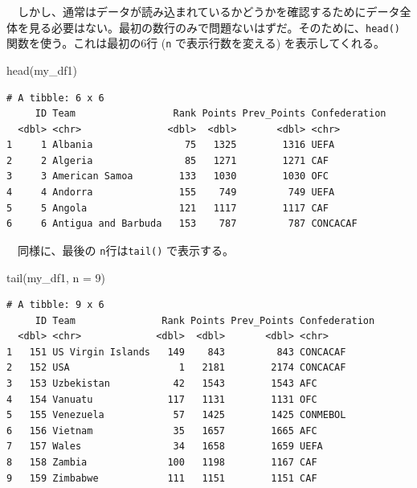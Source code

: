 \documentclass[
  a4paper,
  pandoc,
  ja=standard,
  jafont=haranoaji]{bxjsbook}
\newenvironment{Shaded}{\begin{snugshade}}{\end{snugshade}}
\newcommand{\AttributeTok}[1]{\textcolor[rgb]{0.00,0.48,0.65}{#1}}
\newcommand{\DecValTok}[1]{\textcolor[rgb]{0.68,0.00,0.00}{#1}}
\newcommand{\FunctionTok}[1]{\textcolor[rgb]{0.28,0.35,0.67}{#1}}
\newcommand{\NormalTok}[1]{\textcolor[rgb]{0.00,0.48,0.65}{#1}}
\begin{document}
　しかし、通常はデータが読み込まれているかどうかを確認するためにデータ全体を見る必要はない。最初の数行のみで問題ないはずだ。そのために、\texttt{head()}
関数を使う。これは最初の6行 (\texttt{n} で表示行数を変える)
を表示してくれる。

\begin{Shaded}
\begin{Highlighting}[numbers=left,,]
\FunctionTok{head}\NormalTok{(my\_df1)}
\end{Highlighting}
\end{Shaded}

\begin{verbatim}
# A tibble: 6 x 6
     ID Team                 Rank Points Prev_Points Confederation
  <dbl> <chr>               <dbl>  <dbl>       <dbl> <chr>        
1     1 Albania                75   1325        1316 UEFA         
2     2 Algeria                85   1271        1271 CAF          
3     3 American Samoa        133   1030        1030 OFC          
4     4 Andorra               155    749         749 UEFA         
5     5 Angola                121   1117        1117 CAF          
6     6 Antigua and Barbuda   153    787         787 CONCACAF     
\end{verbatim}

　同様に、最後の \texttt{n}行は\texttt{tail()} で表示する。

\begin{Shaded}
\begin{Highlighting}[numbers=left,,]
\FunctionTok{tail}\NormalTok{(my\_df1, }\AttributeTok{n =} \DecValTok{9}\NormalTok{)}
\end{Highlighting}
\end{Shaded}

\begin{verbatim}
# A tibble: 9 x 6
     ID Team               Rank Points Prev_Points Confederation
  <dbl> <chr>             <dbl>  <dbl>       <dbl> <chr>        
1   151 US Virgin Islands   149    843         843 CONCACAF     
2   152 USA                   1   2181        2174 CONCACAF     
3   153 Uzbekistan           42   1543        1543 AFC          
4   154 Vanuatu             117   1131        1131 OFC          
5   155 Venezuela            57   1425        1425 CONMEBOL     
6   156 Vietnam              35   1657        1665 AFC          
7   157 Wales                34   1658        1659 UEFA         
8   158 Zambia              100   1198        1167 CAF          
9   159 Zimbabwe            111   1151        1151 CAF          
\end{verbatim}
\end{document}
